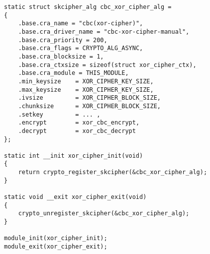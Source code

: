 \begin{verbatim}
static struct skcipher_alg cbc_xor_cipher_alg =
{
    .base.cra_name = "cbc(xor-cipher)",
    .base.cra_driver_name = "cbc-xor-cipher-manual",
    .base.cra_priority = 200,
    .base.cra_flags = CRYPTO_ALG_ASYNC,
    .base.cra_blocksize = 1,
    .base.cra_ctxsize = sizeof(struct xor_cipher_ctx),
    .base.cra_module = THIS_MODULE,
    .min_keysize    = XOR_CIPHER_KEY_SIZE,
    .max_keysize    = XOR_CIPHER_KEY_SIZE,
    .ivsize         = XOR_CIPHER_BLOCK_SIZE,
    .chunksize      = XOR_CIPHER_BLOCK_SIZE,
    .setkey         = ... ,
    .encrypt        = xor_cbc_encrypt,
    .decrypt        = xor_cbc_decrypt
};

static int __init xor_cipher_init(void)
{
    return crypto_register_skcipher(&cbc_xor_cipher_alg);
}

static void __exit xor_cipher_exit(void)
{
    crypto_unregister_skcipher(&cbc_xor_cipher_alg);
}

module_init(xor_cipher_init);
module_exit(xor_cipher_exit);
\end{verbatim}

